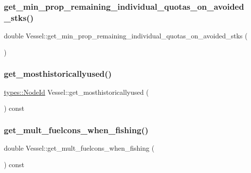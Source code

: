 \subsubsection{\texorpdfstring{get\_min\_prop\_remaining\_individual\_quotas\_on\_avoided\_stks()}{get\_min\_prop\_remaining\_individual\_quotas\_on\_avoided\_stks()}}
{\footnotesize\ttfamily double Vessel\+::get\+\_\+min\+\_\+prop\+\_\+remaining\+\_\+individual\+\_\+quotas\+\_\+on\+\_\+avoided\+\_\+stks (\begin{DoxyParamCaption}{ }\end{DoxyParamCaption})}

\mbox{\label{class_vessel_a8d0bcc579062a96298aabfe2dd08257c}} 
\subsubsection{\texorpdfstring{get\_mosthistoricallyused()}{get\_mosthistoricallyused()}}
{\footnotesize\ttfamily \mbox{\hyperlink{classtypes_1_1_node_id}{types\+::\+Node\+Id}} Vessel\+::get\+\_\+mosthistoricallyused (\begin{DoxyParamCaption}{ }\end{DoxyParamCaption}) const}

\mbox{\label{class_vessel_a5a0dd1a2727976a94baccc62ce0dfb21}} 
\subsubsection{\texorpdfstring{get\_mult\_fuelcons\_when\_fishing()}{get\_mult\_fuelcons\_when\_fishing()}}
{\footnotesize\ttfamily double Vessel\+::get\+\_\+mult\+\_\+fuelcons\+\_\+when\+\_\+fishing (\begin{DoxyParamCaption}{ }\end{DoxyParamCaption}) const}

\mbox{\label{class_vessel_ac86f09da4c2d37156d0366043ca58ebb}} 
